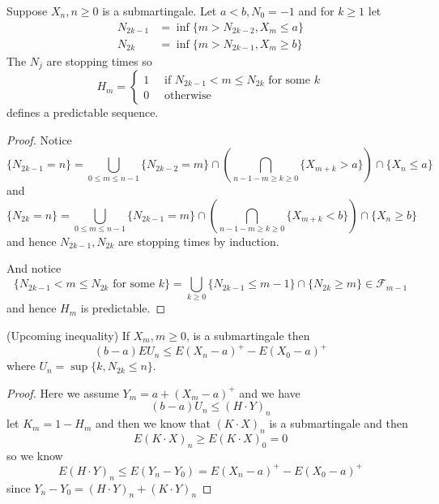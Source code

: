 \documentclass[lang=en, color=blue, ]{elegantbook}
\newcommand{\F}{\mathcal{F}}
\begin{document}
\begin{definition}
    Suppose $X_n, n\geq 0$ is a submartingale. Let $a<b, N_0 = -1$ and for $k\geq 1$ let
    \[
    \begin{aligned}
        N_{2k-1} &= \inf\{m>N_{2k-2},X_m\leq a\} \\
        N_{2k} &= \inf\{m>N_{2k-1}, X_m \geq b\}
    \end{aligned}
    \] 
    The $N_j$ are stopping times so
    \[
    H_m = \begin{cases}
        1\quad\text{ if }N_{2k-1}<m\leq N_{2k}\text{ for some }k\\
        0\quad\text{ otherwise}
    \end{cases}
    \]
    defines a predictable sequence.
\end{definition}
\begin{proof}\par
    Notice
    \[\{N_{2k-1} = n\} = \bigcup_{0\leq m \leq n-1}\{N_{2k-2} = m\}\cap(\bigcap_{ n-1-m\geq k\geq 0}\{X_{m+k} > a\})\cap\{X_n \leq a\}\]
    and
    \[
    \{N_{2k} = n\} = \bigcup_{0\leq m \leq n-1}\{N_{2k-1} = m\}\cap(\bigcap_{ n-1-m\geq k\geq 0}\{X_{m+k} < b\})\cap\{X_n \geq b\}
    \]
    and hence $N_{2k-1},N_{2k}$ are stopping times by induction.\par
    And notice
    \[
    \{N_{2k-1}<m\leq N_{2k}\text{ for some }k\} = \bigcup_{k\geq 0} \{N_{2k-1} \leq m-1\}\cap\{N_{2k}\geq m\} \in \F_{m-1}
    \]
    and hence $H_m$ is predictable.
\end{proof}

\begin{theorem}
    (Upcoming inequality) If $X_m,m\geq 0$, is a submartingale then
    \[(b-a)EU_n \leq E(X_n-a)^+ - E(X_0-a)^+\]
    where $U_n = \sup\{k, N_{2k} \leq n\}$.
\end{theorem}
\begin{proof}\par
    Here we assume $Y_m = a+(X_m-a)^+$ and we have
    \[
    (b-a)U_n \leq (H\cdot Y)_n
    \]
    let $K_m = 1-H_m$ and then we know that $(K\cdot X)_n$ is a submartingale and then
    \[E(K\cdot X)_n \geq E(K\cdot X)_0 = 0\]
    so we know
    \[E(H\cdot Y)_n \leq E(Y_n-Y_0) = E(X_n-a)^+ - E(X_0-a)^+\]
    since $Y_n-Y_0 = (H\cdot Y)_n + (K\cdot Y)_n$
\end{proof}
\end{document}
